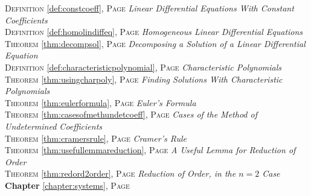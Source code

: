 \begin{multicols}{2}
{\textsc{Definition} \ref{def:constcoeff}, \textsc{Page} \pageref{def:constcoeff} \textit{Linear Differential Equations With Constant Coefficients} \\
\textsc{Definition} \ref{def:homolindiffeq}, \textsc{Page} \pageref{def:homolindiffeq} \textit{Homogeneous Linear Differential Equations} \\
\textsc{Theorem} \ref{thm:decompsol}, \textsc{Page} \pageref{thm:decompsol} \textit{Decomposing a Solution of a Linear Differential Equation} \\
\textsc{Definition} \ref{def:characteristicpolynomial}, \textsc{Page} \pageref{def:characteristicpolynomial} \textit{Characteristic Polynomials} \\
\textsc{Theorem} \ref{thm:usingcharpoly}, \textsc{Page} \pageref{thm:usingcharpoly} \textit{Finding Solutions With Characteristic Polynomials} \\
\textsc{Theorem} \ref{thm:eulerformula}, \textsc{Page} \pageref{thm:eulerformula} \textit{Euler's Formula} \\
\textsc{Theorem} \ref{thm:casesofmethundetcoeff}, \textsc{Page} \pageref{thm:casesofmethundetcoeff} \textit{Cases of the Method of Undetermined Coefficients} \\
\textsc{Theorem} \ref{thm:cramersrule}, \textsc{Page} \pageref{thm:cramersrule} \textit{Cramer's Rule} \\
\textsc{Theorem} \ref{thm:usefullemmareduction}, \textsc{Page} \pageref{thm:usefullemmareduction} \textit{A Useful Lemma for Reduction of Order} \\
\textsc{Theorem} \ref{thm:redord2order}, \textsc{Page} \pageref{thm:redord2order} \textit{Reduction of Order, in the \(n=2\) Case} \\
\textbf{Chapter} \ref{chapter:systems}, \textsc{Page} \pageref{chapter:systems} \\

      }
\end{multicols}

